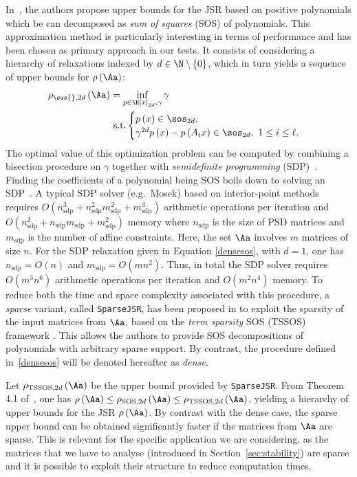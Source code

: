 In~\cite{parrilo}, the authors propose upper bounds for the JSR based on positive polynomials which be can decomposed as \emph{sum of squares} (SOS) of polynomials.
This approximation method is particularly interesting in terms of performance and has been chosen as primary approach in our tests. 
%
It consists of considering a hierarchy of relaxations indexed by $d\in\N\setminus \left\{ 0 \right\}$, which in turn yields a sequence of upper bounds for $\rho\left(\Aa\right)$:
\begin{align}
    \label{densesos}
    \rho_{\sos{},2d}\left(\Aa\right) &= \inf_{p\in\R\left[x\right]_{2d},\gamma}  \gamma \\
    &\textrm{ s.t.} 
    \begin{cases} 
        p\left(x\right)\in\sos_{2d},\\
        \gamma^{2d}p\left(x\right)-p\left(A_ix\right)\in\sos_{2d},\ 1 \leq i \leq \ell.
    \end{cases} \nonumber
\end{align}
%
The optimal value of this optimization problem can be computed by combining a bisection procedure on $\gamma$ together with \emph{semidefinite programming} (SDP)~\cite{wolkowicz2012handbook}.
Finding the coefficients of a polynomial being SOS boils down to solving an SDP~\cite{re2, parrilo2000structured, lasserre2001global}.
A typical SDP solver (e.g.~Mosek) based on interior-point methods requires $O(n_{\text{sdp}}^3 + n_{\text{sdp}}^2 m_{\text{sdp}}^2 + m_{\text{sdp}}^3)$ arithmetic operations per iteration and $O(n_{\text{sdp}}^2 + n_{\text{sdp}} m_{\text{sdp}} + m_{\text{sdp}}^2)$ memory where $n_{\text{sdp}}$ is the size of PSD matrices and $m_{\text{sdp}}$ is the number of affine constraints.
Here, the set $\Aa$ involves $m$ matrices of size $n$.
For the SDP relaxation given in Equation \eqref{densesos}, with $d = 1$, one has $n_{\text{sdp}} = O(n)$ and $m_{\text{sdp}} = O(m n^2)$.
Thus, in total the SDP solver requires $O(m^3 n^6)$ arithmetic operations per iteration and $O(m^2 n^4)$ memory.
%
To reduce both the time and space complexity associated with this procedure, a \emph{sparse} variant, called \texttt{SparseJSR}, has been proposed in \cite{sparsejsr} to exploit the sparsity of the input matrices from $\Aa$, based on the \emph{term sparsity} SOS (TSSOS) framework \cite{tssos}.
This allows the authors to provide SOS decompositions of polynomials with arbitrary sparse support.
By contrast, the procedure defined in~\eqref{densesos} will be denoted hereafter as \emph{dense}.

Let $\rho_{\textrm{TSSOS},2d}\left(\Aa\right)$ be the upper bound provided by \texttt{SparseJSR}.
From Theorem 4.1 of~\cite{sparsejsr}, one has $\rho\left(\Aa\right) \leq \rho_{\textrm{SOS},2d}\left(\Aa\right) \leq \rho_{\textrm{TSSOS},2d}\left(\Aa\right)$, yielding a hierarchy of upper bounds for the JSR $\rho\left(\Aa\right)$.
By contrast with the dense case, the sparse upper bound can be obtained significantly faster if the matrices from $\Aa$ are sparse.
This is relevant for the specific application we are considering, as the matrices that we have to analyse (introduced in Section~\ref{sec:stability}) are sparse and it is possible to exploit their structure to reduce computation times.
